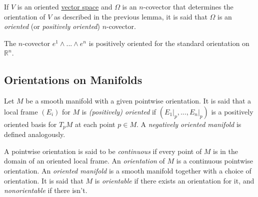 \documentclass{article}
\newcounter{definition}[section]
\newcounter{example}[section]
\begin{document}
    \begin{definition}
      \label{def:oriented-n-covector}
    If $V$ is an oriented \hyperref[lin-def:vector-space]{vector space} and $\Omega$ is an $n$-covector that determines the orientation of $V$ as described in the previous lemma, it is said that $\Omega$ is an \textit{oriented} (or \textit{positively oriented}) $n$-covector. 
    \end{definition}

    \begin{example}
      \label{ex:positive-orientation-of-e1wedgecdotswedgeen}
    The $n$-covector $e^1 \wedge ... \wedge e^n$ is positively oriented for the standard orientation on $\mathbb{R}^n$. 
    \end{example}

  \subsection{Orientations on Manifolds}

    \begin{definition}
      \label{def:positively-oriented-local-frame}
    Let $M$ be a smooth manifold with a given pointwise orientation. It is said that a local frame $(E_i)$ for $M$ is \textit{(positively) oriented} if $(E_1 \big|_p, ..., E_n \big|_p)$ is a positively oriented basis for $T_p M$ at each point $p \in M$. A \textit{negatively oriented manifold} is defined analogously. 
    \end{definition}

    \begin{definition}
      \label{def:continuous-pointwise-orientation}
    A pointwise orientation is said to be \textit{continuous} if every point of $M$ is in the domain of an oriented local frame. An \textit{orientation} of $M$ is a continuous pointwise orientation. An \textit{oriented manifold} is a smooth manifold together with a choice of orientation. It is said that $M$ is \textit{orientable} if there exists an orientation for it, and \textit{nonorientable} if there isn't. 
    \end{definition}
\end{document}
